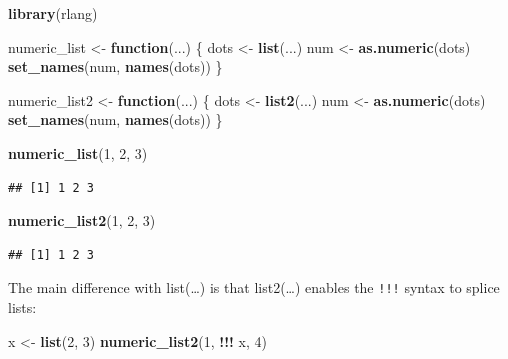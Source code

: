 \documentclass[]{book}
\newenvironment{Shaded}{\begin{snugshade}}{\end{snugshade}}
\newcommand{\ControlFlowTok}[1]{\textcolor[rgb]{0.13,0.29,0.53}{\textbf{#1}}}
\newcommand{\DecValTok}[1]{\textcolor[rgb]{0.00,0.00,0.81}{#1}}
\newcommand{\KeywordTok}[1]{\textcolor[rgb]{0.13,0.29,0.53}{\textbf{#1}}}
\newcommand{\NormalTok}[1]{#1}
\newcommand{\OperatorTok}[1]{\textcolor[rgb]{0.81,0.36,0.00}{\textbf{#1}}}
\newcommand{\StringTok}[1]{\textcolor[rgb]{0.31,0.60,0.02}{#1}}
\begin{document}
\begin{Shaded}
\begin{Highlighting}[]
\KeywordTok{library}\NormalTok{(rlang)}

\NormalTok{numeric_list <-}\StringTok{ }\ControlFlowTok{function}\NormalTok{(...) \{}
\NormalTok{  dots <-}\StringTok{ }\KeywordTok{list}\NormalTok{(...)}
\NormalTok{  num <-}\StringTok{ }\KeywordTok{as.numeric}\NormalTok{(dots)}
  \KeywordTok{set_names}\NormalTok{(num, }\KeywordTok{names}\NormalTok{(dots))}
\NormalTok{\}}

\NormalTok{numeric_list2 <-}\StringTok{ }\ControlFlowTok{function}\NormalTok{(...) \{}
\NormalTok{  dots <-}\StringTok{ }\KeywordTok{list2}\NormalTok{(...)}
\NormalTok{  num <-}\StringTok{ }\KeywordTok{as.numeric}\NormalTok{(dots)}
  \KeywordTok{set_names}\NormalTok{(num, }\KeywordTok{names}\NormalTok{(dots))}
\NormalTok{\}}

\KeywordTok{numeric_list}\NormalTok{(}\DecValTok{1}\NormalTok{, }\DecValTok{2}\NormalTok{, }\DecValTok{3}\NormalTok{)}
\end{Highlighting}
\end{Shaded}

\begin{verbatim}
## [1] 1 2 3
\end{verbatim}

\begin{Shaded}
\begin{Highlighting}[]
\KeywordTok{numeric_list2}\NormalTok{(}\DecValTok{1}\NormalTok{, }\DecValTok{2}\NormalTok{, }\DecValTok{3}\NormalTok{)}
\end{Highlighting}
\end{Shaded}

\begin{verbatim}
## [1] 1 2 3
\end{verbatim}

The main difference with list(\ldots{}) is that list2(\ldots{}) enables the \texttt{!!!} syntax to splice lists:

\begin{Shaded}
\begin{Highlighting}[]
\NormalTok{x <-}\StringTok{ }\KeywordTok{list}\NormalTok{(}\DecValTok{2}\NormalTok{, }\DecValTok{3}\NormalTok{)}
\KeywordTok{numeric_list2}\NormalTok{(}\DecValTok{1}\NormalTok{, }\OperatorTok{!!!}\StringTok{ }\NormalTok{x, }\DecValTok{4}\NormalTok{)}
\end{Highlighting}
\end{Shaded}
\end{document}
